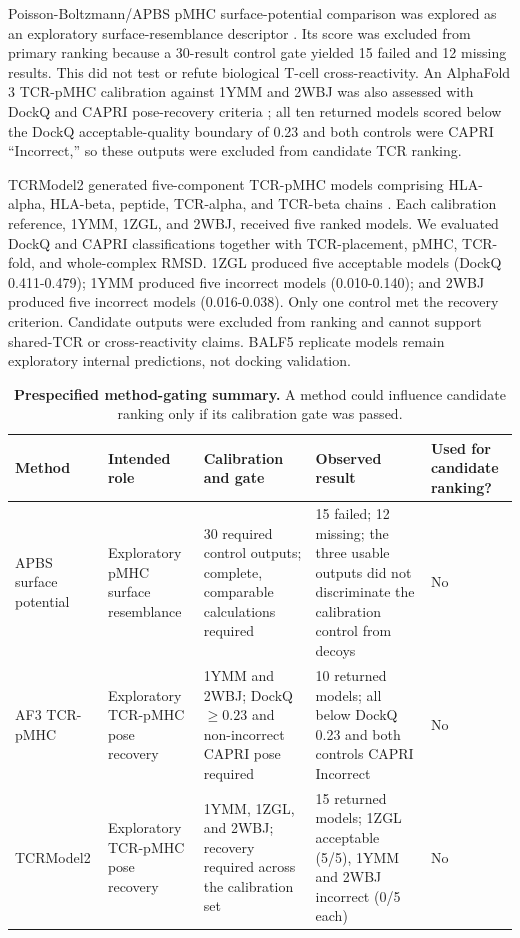\documentclass[11pt]{article}
\begin{document}
Poisson-Boltzmann/APBS pMHC surface-potential comparison was explored as an exploratory surface-resemblance descriptor \cite{apbs}. Its score was excluded from primary ranking because a 30-result control gate yielded 15 failed and 12 missing results. This did not test or refute biological T-cell cross-reactivity. An AlphaFold 3 TCR-pMHC calibration against 1YMM and 2WBJ was also assessed with DockQ and CAPRI pose-recovery criteria \cite{dockq,capri}; all ten returned models scored below the DockQ acceptable-quality boundary of 0.23 and both controls were CAPRI ``Incorrect,'' so these outputs were excluded from candidate TCR ranking.

TCRModel2 generated five-component TCR-pMHC models comprising HLA-alpha, HLA-beta, peptide, TCR-alpha, and TCR-beta chains \cite{tcr}. Each calibration reference, 1YMM, 1ZGL, and 2WBJ, received five ranked models. We evaluated DockQ and CAPRI classifications together with TCR-placement, pMHC, TCR-fold, and whole-complex RMSD. 1ZGL produced five acceptable models (DockQ 0.411-0.479); 1YMM produced five incorrect models (0.010-0.140); and 2WBJ produced five incorrect models (0.016-0.038). Only one control met the recovery criterion. Candidate outputs were excluded from ranking and cannot support shared-TCR or cross-reactivity claims. BALF5 replicate models remain exploratory internal predictions, not docking validation.

\begin{table}[H]
\centering
\scriptsize
\caption*{\textbf{Prespecified method-gating summary.} A method could influence candidate ranking only if its calibration gate was passed.}
\setlength{\tabcolsep}{3pt}\renewcommand{\arraystretch}{1.18}
\begin{tabular}{p{}p{}p{}p{}p{}}
\toprule
Method & Intended role & Calibration and gate & Observed result & Used for candidate ranking?\\\midrule
APBS surface potential & Exploratory pMHC surface resemblance & 30 required control outputs; complete, comparable calculations required & 15 failed; 12 missing; the three usable outputs did not discriminate the calibration control from decoys & No\\
AF3 TCR-pMHC & Exploratory TCR-pMHC pose recovery & 1YMM and 2WBJ; DockQ $\geq0.23$ and non-incorrect CAPRI pose required & 10 returned models; all below DockQ 0.23 and both controls CAPRI Incorrect & No\\
TCRModel2 & Exploratory TCR-pMHC pose recovery & 1YMM, 1ZGL, and 2WBJ; recovery required across the calibration set & 15 returned models; 1ZGL acceptable (5/5), 1YMM and 2WBJ incorrect (0/5 each) & No\\
\bottomrule
\end{tabular}
\end{table}
\end{document}
